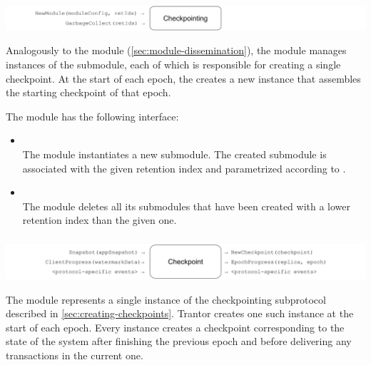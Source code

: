 \documentclass{article}
\begin{document}
\subsubsection{}

\includegraphics[width=\textwidth]{figures/modules/module-checkpointing.pdf}

Analogously to the  module (\cref{sec:module-dissemination}),
the  module manages instances of the  submodule,
each of which is responsible for creating a single checkpoint.
At the start of each epoch, the  creates a new  instance that assembles the starting checkpoint of that epoch.

The  module has the following interface:

\begin{itemize}

    \item {}\\
    The  module instantiates a new  submodule.
    The created submodule is associated with the given retention index and parametrized according to .

    \item {}\\
    The  module deletes all its submodules that have been created with a lower retention index than the given one.

\end{itemize}

\subsubsection{}

\includegraphics[width=\textwidth]{figures/modules/module-checkpoint.pdf}

The  module represents a single instance of the checkpointing subprotocol described in \cref{sec:creating-checkpoints}.
Trantor creates one such instance at the start of each epoch.
Every instance creates a checkpoint corresponding to the state of the system after finishing the previous epoch
and before delivering any transactions in the current one.
\end{document}
